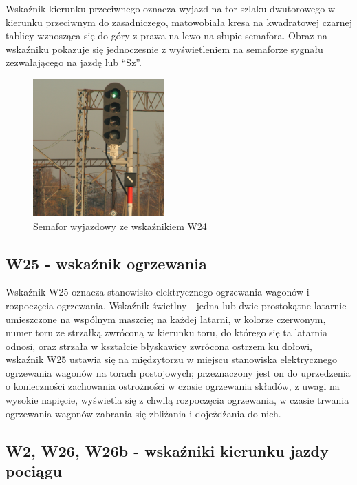 \begin{tcolorbox}[colback=black!5!white,colframe=white!55!black,title=Wskaźnik W24]
{\textquotedbl}Wskaźnik kierunku przeciwnego{\textquotedbl} oznacza wyjazd na tor szlaku dwutorowego w kierunku przeciwnym do zasadniczego, matowobiała kresa na kwadratowej czarnej tablicy wznosząca się do góry z prawa na lewo na słupie semafora. Obraz na wskaźniku pokazuje się jednoczesnie z wyświetleniem na semaforze sygnału zezwalającego na jazdę lub “Sz”.
\end{tcolorbox}
	\begin{figure}
	\includegraphics[width=0.45\textwidth]{skryptkierownik-img/skryptkierownik-img018.jpg}
	\caption{Semafor wyjazdowy ze wskaźnikiem W24}
\end{figure} 

\subsection{W25 - wskaźnik ogrzewania}

Wskaźnik W25 oznacza stanowisko elektrycznego ogrzewania wagonów i rozpoczęcia ogrzewania. Wskaźnik świetlny - jedna lub dwie prostokątne latarnie umieszczone na wspólnym maszcie; na każdej latarni, w kolorze czerwonym, numer toru ze strzałką zwróconą w kierunku toru, do którego się ta latarnia odnosi, oraz strzała w kształcie błyskawicy zwrócona ostrzem ku dołowi, wskaźnik W25 ustawia się na międzytorzu w miejscu stanowiska elektrycznego ogrzewania wagonów na torach postojowych; przeznaczony jest on do uprzedzenia o konieczności zachowania ostrożności w czasie ogrzewania składów, z uwagi na wysokie napięcie, wyświetla się z chwilą rozpoczęcia ogrzewania, w czasie trwania ogrzewania wagonów zabrania się zbliżania i dojeżdżania do nich.

\subsection{W2, W26, W26b - wskaźniki kierunku jazdy pociągu}

